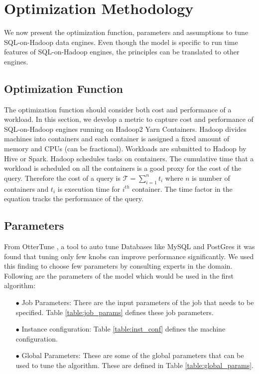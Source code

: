 \section{Optimization Methodology}
We now present the optimization function, parameters and assumptions to tune SQL-on-Hadoop data engines. Even though the model is specific to run time features of SQL-on-Hadoop engines, the principles can be translated to other engines. 

\subsection{Optimization Function}
The optimization function should consider both cost and performance of a workload. In this section, we develop a metric to capture cost and performance of SQL-on-Hadoop engines running on Hadoop2 Yarn Containers. Hadoop divides machines into containers and each container is assigned a fixed amount of memory and CPUs (can be fractional). Workloads are submitted to Hadoop by Hive or Spark. Hadoop schedules tasks on containers. 
The cumulative time that a workload is scheduled on all the containers is a good proxy for the cost of the query. Therefore the cost of a query is $\mathcal{T} = \sum_{i=1}^{n} t_i$ where $n$ is number of containers and $t_i$ is execution time for $i^{th}$ container. The time factor in the equation tracks the performance of the query.

\subsection{Parameters}
From OtterTune \cite{VanKen}, a tool to auto tune Databases like MySQL and PostGres it was found that tuning only few knobs can improve performance significantly. We used this finding to choose few parameters by consulting experts in the domain. Following are the parameters of the model which would be used in the first algorithm:
\begin{enumerate}
    \item[$\bullet$] Job Parameters: There are the input parameters of the job that needs to be specified. Table \ref{table:job_params} defines these job parameters.
    \item[$\bullet$] Instance configuration: Table \ref{table:inst_conf} defines the machine configuration.
    \item[$\bullet$] Global Parameters: These are some of the global parameters that can be used to tune the algorithm. These are defined in Table \ref{table:global_params}.
\end{enumerate}

